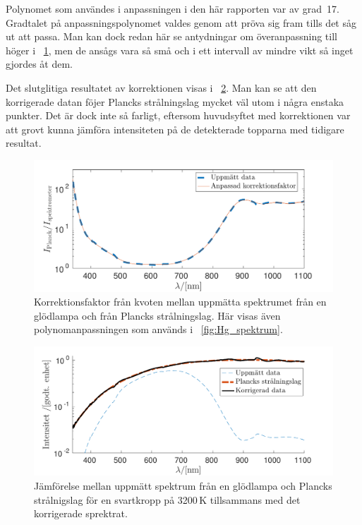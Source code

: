\documentclass[11pt,a4paper]{article}
\newcommand{\figref}{\figurename~\ref}
\begin{document}
Polynomet som användes i anpassningen i den här rapporten var av
grad~17. Gradtalet på anpassningspolynomet valdes genom att pröva sig
fram tills det såg ut att passa. Man kan dock redan här se antydningar
om överanpassning till höger i \figref{fig:korrektionsfaktor}, men de
ansågs vara så små och i ett intervall av mindre vikt så inget gjordes
åt dem. 

Det slutglitiga resultatet av korrektionen visas i
\figref{fig:anpassad_svartkropp}. Man kan se att den korrigerade datan
föjer Plancks strålningslag mycket väl utom i några enstaka
punkter. Det är dock inte så farligt, eftersom huvudsyftet med
korrektionen var att grovt kunna jämföra intensiteten på de
detekterade topparna med tidigare resultat. 

\begin{figure}\centering
\centerline{ %
\includegraphics[width=.8\textwidth]{korrektionsfaktor.pdf}
}
\caption{Korrektionsfaktor från kvoten mellan uppmätta spektrumet från
en glödlampa och från Plancks strålningslag. Här visas även
polynomanpassningen som används i \figref{fig:Hg_spektrum}.}
\label{fig:korrektionsfaktor}
\end{figure}

\begin{figure}\centering
\centerline{ %
\includegraphics[width=.8\textwidth]{anpassad_svartkropp.pdf}
}
\caption{Jämförelse mellan uppmätt spektrum från en glödlampa och
  Plancks strålnigslag för en svartkropp på 3200\,K tillsammans med
  det korrigerade sprektrat. }
\label{fig:anpassad_svartkropp}
\end{figure}
\end{document}
